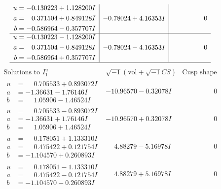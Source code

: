 \documentclass[1p]{elsarticle_modified}
\theoremstyle{definition}
\newcommand{\I}{\sqrt{-1}}
\begin{document}
$$\begin{array}{c|c|c}
\begin{aligned}
u &= -0.130223 + 1.128200 I \\
a &= \phantom{-}0.371504 + 0.849128 I \\
b &= -0.586964 - 0.357707 I\end{aligned}
 & -0.78024 + 4.16353 I & \phantom{-0.000000 } 0 \\ \hline\begin{aligned}
u &= -0.130223 - 1.128200 I \\
a &= \phantom{-}0.371504 - 0.849128 I \\
b &= -0.586964 + 0.357707 I\end{aligned}
 & -0.78024 - 4.16353 I & \phantom{-0.000000 } 0\\
 \hline 
 \end{array}$$\newpage$$\begin{array}{c|c|c}  
\text{Solutions to }I^u_{1}& \I (\text{vol} + \sqrt{-1}CS) & \text{Cusp shape}\\
 \hline 
\begin{aligned}
u &= \phantom{-}0.705533 + 0.893072 I \\
a &= -1.36631 - 1.76146 I \\
b &= \phantom{-}1.05906 - 1.46524 I\end{aligned}
 & -10.96570 - 0.32078 I & \phantom{-0.000000 } 0 \\ \hline\begin{aligned}
u &= \phantom{-}0.705533 - 0.893072 I \\
a &= -1.36631 + 1.76146 I \\
b &= \phantom{-}1.05906 + 1.46524 I\end{aligned}
 & -10.96570 + 0.32078 I & \phantom{-0.000000 } 0 \\ \hline\begin{aligned}
u &= \phantom{-}0.178051 + 1.133310 I \\
a &= \phantom{-}0.475422 + 0.121754 I \\
b &= -1.104570 + 0.260893 I\end{aligned}
 & \phantom{-}4.88279 - 5.16978 I & \phantom{-0.000000 } 0 \\ \hline\begin{aligned}
u &= \phantom{-}0.178051 - 1.133310 I \\
a &= \phantom{-}0.475422 - 0.121754 I \\
b &= -1.104570 - 0.260893 I\end{aligned}
 & \phantom{-}4.88279 + 5.16978 I & \phantom{-0.000000 } 0 \\ \hline\begin{aligned}

\end{aligned}
\end{array}$$
\end{document}
